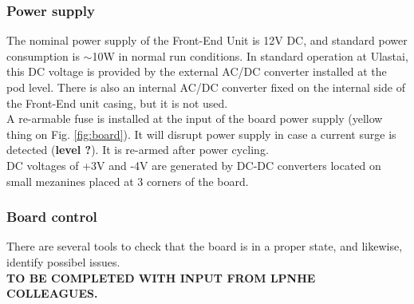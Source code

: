 \subsubsection{Power supply}
The nominal power supply of the Front-End Unit is 12V DC, and standard power consumption is $\sim$10W in normal run conditions. In standard operation at Ulastai, this DC voltage is provided by the external AC/DC converter installed at the pod level. There is also an internal AC/DC converter fixed on the internal side of the Front-End unit casing, but it is not used. \\
%
A re-armable fuse is installed at the input of the board power supply (yellow thing on Fig. \ref{fig:board}). It will disrupt power supply in case a current surge is detected ({\bf level ?}). It is re-armed after power cycling. \\
%
DC voltages of +3V and -4V are generated by DC-DC converters located on small mezanines placed at 3 corners of the board.

\subsubsection{Board control}
\label{control}
There are several tools to check that the board is in a proper state, and likewise, identify possibel issues. \\
%

 {\bf TO BE COMPLETED WITH INPUT FROM LPNHE COLLEAGUES.}
